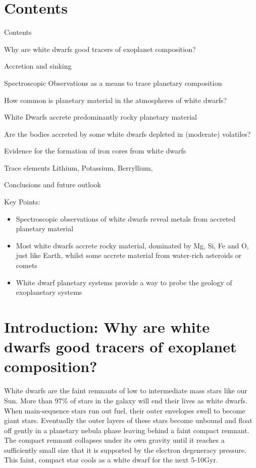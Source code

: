\documentclass[onecolumn,authoryear]{els-mrw}
\begin{document}
\section{Contents}

\begin{enumerate}
\item{Contents}
    \item{Why are white dwarfs good tracers of exoplanet composition?}
    \item{Accretion and sinking}
    \item{Spectroscopic Observations as a means to trace planetary composition}
    \item{How common is planetary material in the atmospheres of white dwarfs?}
\item {White Dwarfs accrete predominantly rocky planetary material}
\item{Are the bodies accreted by some white dwarfs depleted in (moderate) volatiles?}
\item{Evidence for the formation of iron cores from white dwarfs}

\item{Trace elements}
Lithium, Potassium, Berryllium, 

{\item Conclusions and future outlook}
    
\end{enumerate}


\begin{BoxTypeA}[key]{Key Points:}
\begin{itemize}
    \item Spectroscopic observations of white dwarfs reveal metals from accreted planetary material
    \item Most white dwarfs accrete rocky material, dominated by Mg, Si, Fe and O, just like Earth, whilst some accrete material from water-rich asteroids or comets
    \item White dwarf planetary systems provide a way to probe the geology of exoplanetary systems
\end{itemize}
\end{BoxTypeA}




  \section{Introduction: Why are white dwarfs good tracers of exoplanet composition?}


White dwarfs are the faint remnants of low to intermediate mass stars like our Sun. More than 97\% of stars in the galaxy will end their lives as white dwarfs.%
When main-sequence stars run out fuel, their outer envelopes swell to become giant stars. Eventually the outer layers of these stars become unbound and float off gently in a planetary nebula phase leaving behind a faint compact remnant. The compact remnant collapses under its own gravity until it reaches a sufficiently small size that it is supported by the electron degeneracy pressure. This faint, compact star cools as a white dwarf for the next 5-10Gyr. 
\end{document}
